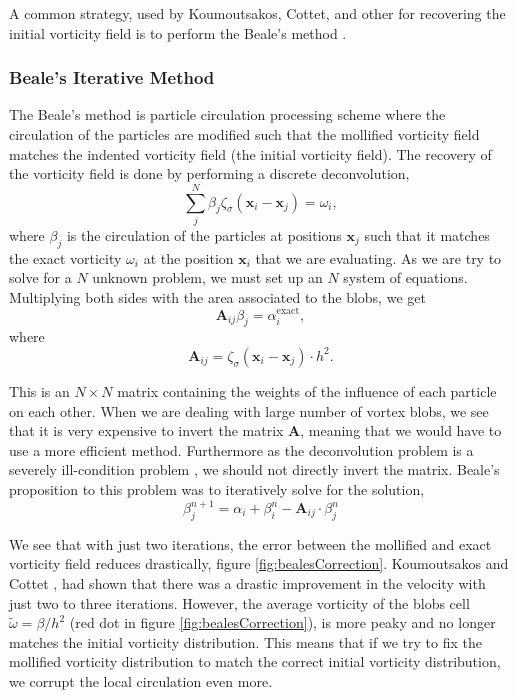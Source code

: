 A common strategy, used by Koumoutsakos, Cottet, and other for recovering the initial vorticity field is to perform the Beale's method \cite{Beale1988} \cite{Cottet2000a}.


\subsubsection*{Beale's Iterative Method}
\label{subsubsec:BealesMethod}
The Beale's method is particle circulation processing scheme where the circulation of the particles are modified such that the mollified vorticity field matches the indented vorticity field (the initial vorticity field). The recovery of the vorticity field is done by performing a discrete deconvolution,
	\begin{equation}
	\sum_j^N \beta_j \zeta_{\sigma}\left(\mathbf{x}_i-\mathbf{x}_j\right) = \omega_i,
		\end{equation}
where $\beta_j$ is the circulation of the particles at positions $\mathbf{x}_j$ such that it matches the exact vorticity $\omega_i$ at the position $\mathbf{x}_i$ that we are evaluating.  As we are try to solve for a $N$ unknown problem, we must set up an $N$ system of equations. Multiplying both sides with the area associated to the blobs, we get
	\begin{equation}
	\mathbf{A}_{ij} \beta_j = \alpha_i^{\mathrm{exact}},
	\end{equation}
where
	\begin{equation}
	\mathbf{A}_{ij} = \zeta_{\sigma}\left(\mathbf{x}_i - \mathbf{x}_j\right) \cdot h^2.
	\end{equation}

This is an $N \times N$ matrix containing the weights of the influence of each particle on each other. When we are dealing with large number of vortex blobs, we see that it is very expensive to invert the matrix $\mathbf{A}$, meaning that we would have to use a more efficient method. Furthermore as the deconvolution problem is a severely ill-condition problem \cite{Cottet2000a}, we should not directly invert the matrix. Beale's proposition to this problem was to iteratively solve for the solution,
	\begin{equation}
	\beta_{j}^{n+1} = \alpha_i + \beta_i^n - \mathbf{A}_{ij}\cdot\beta_j^n
	\end{equation}
	
We see that with just two iterations, the error between the mollified and exact vorticity field reduces drastically, figure \ref{fig:bealesCorrection}. Koumoutsakos and Cottet \cite{Cottet2000a}, had shown that there was a drastic improvement in the velocity with just two to three iterations. However, the average vorticity of the blobs cell $\tilde{\omega} = \beta/h^2$ (red dot in figure \ref{fig:bealesCorrection}), is more peaky and no longer matches the initial vorticity distribution. This means that if we try to fix the mollified vorticity distribution to match the correct initial vorticity distribution, we corrupt the local circulation even more.


